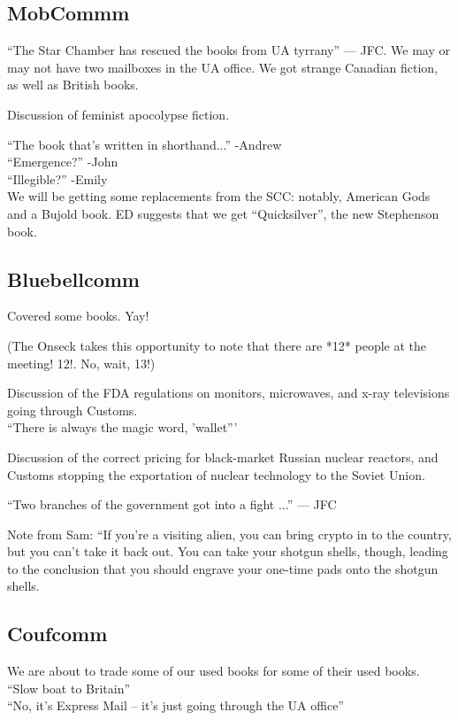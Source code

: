\documentclass[10pt]{article}
\begin{document}
\subsection*{MobCommm}
``The Star Chamber has rescued the books from UA tyrrany'' --- JFC.  
We may or may not have two mailboxes in the UA office.
We got strange Canadian fiction, as well as British books.

Discussion of feminist apocolypse fiction.

``The book that's written in shorthand...'' -Andrew\\
``Emergence?'' -John\\
``Illegible?'' -Emily\\

We will be getting some replacements from the SCC: notably, American
Gods and a Bujold book.  ED suggests that we get ``Quicksilver'', the
new Stephenson book.

\subsection*{Bluebellcomm}
Covered some books. Yay!

(The Onseck takes this opportunity to note that there are *12* people
at the meeting! 12!. No, wait, 13!)

Discussion of the FDA regulations on monitors, microwaves, and x-ray
televisions going through Customs.\\
``There is always the magic word, 'wallet''' 

Discussion of the correct pricing for black-market Russian nuclear
reactors, and Customs stopping the exportation of nuclear technology
to the Soviet Union.

``Two branches of the government got into a fight ...'' --- JFC

Note from Sam: ``If you're a visiting alien, you can bring crypto in to the country,
but you can't take it back out.  You can take your shotgun shells,
though, leading to the conclusion that you should engrave your
one-time pads onto the shotgun shells.

\subsection*{Coufcomm}
We are about to trade some of our used books for some of their used
books.
``Slow boat to Britain''\\
``No, it's Express Mail -- it's just going through the UA office''
\end{document}
